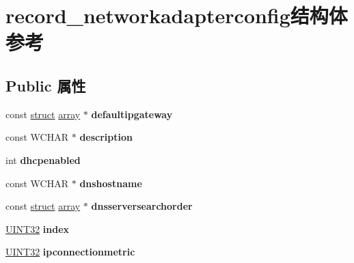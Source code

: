 \hypertarget{structrecord__networkadapterconfig}{}\section{record\+\_\+networkadapterconfig结构体 参考}
\label{structrecord__networkadapterconfig}
\subsection*{Public 属性}
\begin{DoxyCompactItemize}
\item 
\mbox{\label{structrecord__networkadapterconfig_a463b72811463fdcfce9f53af4c788dce}} 
const \hyperlink{interfacestruct}{struct} \hyperlink{structarray}{array} $\ast$ {\bfseries defaultipgateway}
\item 
\mbox{\label{structrecord__networkadapterconfig_aebbe76f8c1cbde94154736ac22503677}} 
const W\+C\+H\+AR $\ast$ {\bfseries description}
\item 
\mbox{\label{structrecord__networkadapterconfig_af4907e8570e69234e2a81b2130344aa0}} 
int {\bfseries dhcpenabled}
\item 
\mbox{\label{structrecord__networkadapterconfig_a81a044abf217e772b6f18624dfcfd4f2}} 
const W\+C\+H\+AR $\ast$ {\bfseries dnshostname}
\item 
\mbox{\label{structrecord__networkadapterconfig_a3c42f72e70e1e5ebcdc2888e99cceecb}} 
const \hyperlink{interfacestruct}{struct} \hyperlink{structarray}{array} $\ast$ {\bfseries dnsserversearchorder}
\item 
\mbox{\label{structrecord__networkadapterconfig_a98c45009f0c5bd821e3f2f1be1bb4171}} 
\hyperlink{_processor_bind_8h_ae1e6edbbc26d6fbc71a90190d0266018}{U\+I\+N\+T32} {\bfseries index}
\item 
\mbox{\label{structrecord__networkadapterconfig_a4fee115b3ca5625378267efebf147e6c}} 
\hyperlink{_processor_bind_8h_ae1e6edbbc26d6fbc71a90190d0266018}{U\+I\+N\+T32} {\bfseries ipconnectionmetric}

\end{DoxyCompactItemize}
